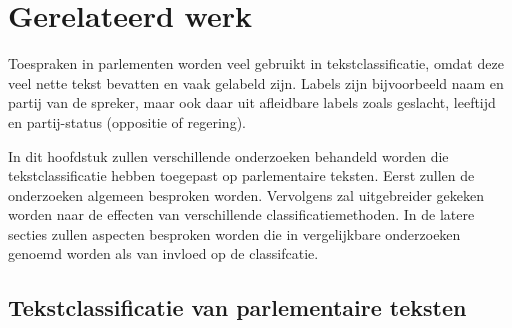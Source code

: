 \section{Gerelateerd werk}
\label{sec:rel}

Toespraken in parlementen worden veel gebruikt in tekstclassificatie, omdat deze veel nette tekst bevatten en vaak gelabeld zijn. Labels zijn bijvoorbeeld naam en partij van de spreker, maar ook daar uit afleidbare labels zoals geslacht, leeftijd en partij-status (oppositie of regering).\par
In dit hoofdstuk zullen verschillende onderzoeken behandeld worden die tekstclassificatie hebben toegepast op parlementaire teksten. Eerst zullen de onderzoeken algemeen besproken worden. Vervolgens zal uitgebreider gekeken worden naar de effecten van verschillende classificatiemethoden. In de latere secties zullen aspecten besproken worden die in vergelijkbare onderzoeken genoemd worden als van invloed op de classifcatie.

\subsection{Tekstclassificatie van parlementaire teksten}

